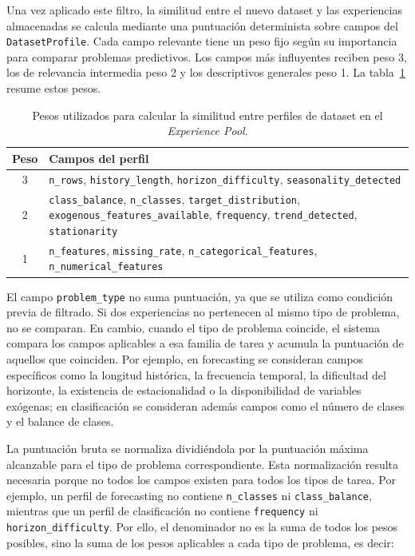 \documentclass[12pt,a4paper]{article}
\theoremstyle{plain}
\begin{document}
Una vez aplicado este filtro, la similitud entre el nuevo dataset y las experiencias almacenadas se calcula mediante una puntuación determinista sobre campos del \texttt{DatasetProfile}. Cada campo relevante tiene un peso fijo según su importancia para comparar problemas predictivos. Los campos más influyentes reciben peso 3, los de relevancia intermedia peso 2 y los descriptivos generales peso 1. La tabla~\ref{tab:retrieval-weights} resume estos pesos.

\begin{table}[H]
\centering
\small
\begin{tabularx}{\linewidth}{c >{\RaggedRight\arraybackslash}X}
\hline
\textbf{Peso} & \textbf{Campos del perfil} \\\hline
3 & \texttt{n\_rows}, \texttt{history\_length}, \texttt{horizon\_difficulty}, \texttt{seasonality\_detected} \\\hline
2 & \texttt{class\_balance}, \texttt{n\_classes}, \texttt{target\_distribution}, \texttt{exogenous\_features\_available}, \texttt{frequency}, \texttt{trend\_detected}, \texttt{stationarity} \\\hline
1 & \texttt{n\_features}, \texttt{missing\_rate}, \texttt{n\_categorical\_features}, \texttt{n\_numerical\_features} \\\hline
\end{tabularx}
\caption{Pesos utilizados para calcular la similitud entre perfiles de dataset en el \textit{Experience Pool}.}
\label{tab:retrieval-weights}
\end{table}

El campo \texttt{problem\_type} no suma puntuación, ya que se utiliza como condición previa de filtrado. Si dos experiencias no pertenecen al mismo tipo de problema, no se comparan. En cambio, cuando el tipo de problema coincide, el sistema compara los campos aplicables a esa familia de tarea y acumula la puntuación de aquellos que coinciden. Por ejemplo, en forecasting se consideran campos específicos como la longitud histórica, la frecuencia temporal, la dificultad del horizonte, la existencia de estacionalidad o la disponibilidad de variables exógenas; en clasificación se consideran además campos como el número de clases y el balance de clases.

La puntuación bruta se normaliza dividiéndola por la puntuación máxima alcanzable para el tipo de problema correspondiente. Esta normalización resulta necesaria porque no todos los campos existen para todos los tipos de tarea. Por ejemplo, un perfil de forecasting no contiene \texttt{n\_classes} ni \texttt{class\_balance}, mientras que un perfil de clasificación no contiene \texttt{frequency} ni \texttt{horizon\_difficulty}. Por ello, el denominador no es la suma de todos los pesos posibles, sino la suma de los pesos aplicables a cada tipo de problema, es decir:
\end{document}
